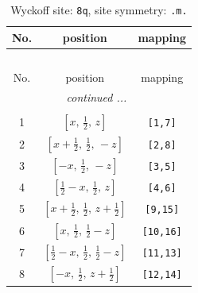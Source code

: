 \documentclass[fleqn,8pt]{jsarticle}
\begin{document}
\begin{longtable}{ccc}
\caption{Wyckoff site: {\tt 8q}, site symmetry: {\tt .m.}}
 \\
 \hline \hline
No. & position & mapping \\ \hline \endfirsthead

\multicolumn{2}{l}{\tablename\ \thetable{}} \\
 \hline \hline
No. & position & mapping \\ \hline \endhead

 \hline \hline
\multicolumn{2}{r}{\footnotesize\it continued ...} \\ \endfoot

 \hline \hline
\multicolumn{2}{r}{} \\ \endlastfoot

1 & $\left[ x,\, \frac{1}{2},\, z \right]$ & {\tt [1,7]} \\ \hline
2 & $\left[ x + \frac{1}{2},\, \frac{1}{2},\, - z \right]$ & {\tt [2,8]} \\ \hline
3 & $\left[ - x,\, \frac{1}{2},\, - z \right]$ & {\tt [3,5]} \\ \hline
4 & $\left[ \frac{1}{2} - x,\, \frac{1}{2},\, z \right]$ & {\tt [4,6]} \\ \hline
5 & $\left[ x + \frac{1}{2},\, \frac{1}{2},\, z + \frac{1}{2} \right]$ & {\tt [9,15]} \\ \hline
6 & $\left[ x,\, \frac{1}{2},\, \frac{1}{2} - z \right]$ & {\tt [10,16]} \\ \hline
7 & $\left[ \frac{1}{2} - x,\, \frac{1}{2},\, \frac{1}{2} - z \right]$ & {\tt [11,13]} \\ \hline
8 & $\left[ - x,\, \frac{1}{2},\, z + \frac{1}{2} \right]$ & {\tt [12,14]} \\
\end{longtable}
\renewcommand{\arraystretch}{1.2}
\end{document}
